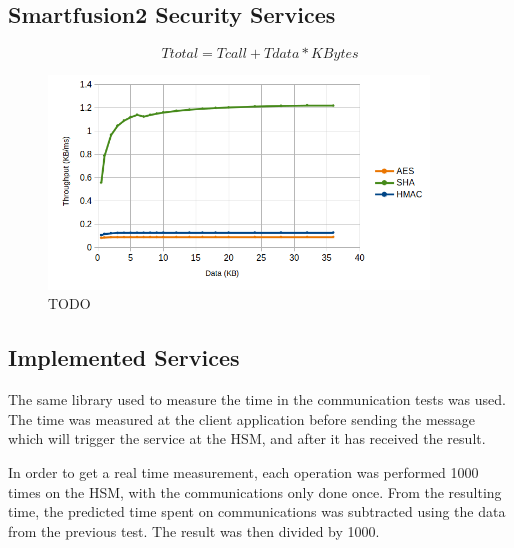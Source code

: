 \subsection{Smartfusion2 Security Services}\label{chap:evaluation:board}

\begin{equation}
	\label{eq:linear-eq}
	Ttotal = Tcall + Tdata * KBytes
\end{equation}



\begin{figure}[h!]
	\centering
	\includegraphics[width=0.9\textwidth]{./Images/core-tput.png}
	\caption{TODO}
	\label{fig:performance:core-tput}
\end{figure}

\subsection{Implemented Services}\label{chap:evaluation:services}

The same library used to measure the time in the communication tests was used.
The time was measured at the client application before sending the message which will trigger the service at the HSM, and after it has received the result.

In order to get a real time measurement, each operation was performed 1000 times on the HSM, with the communications only done once.
From the resulting time, the predicted time spent on communications was subtracted using the data from the previous test. The result was then divided by 1000.

